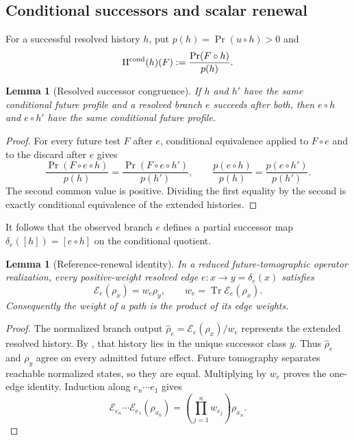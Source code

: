 \documentclass[11pt]{article}
\newtheorem{lemma}[theorem]{Lemma}
\theoremstyle{definition}
\theoremstyle{remark}
\newcommand{\Tr}{\operatorname{Tr}}
\begin{document}
\subsection{Conditional successors and scalar renewal}

For a successful resolved history $h$, put
$p(h)=\Pr(u\circ h)>0$ and
\[
  \Pi^{\rm cond}(h)(F):=\frac{\Pr(F\circ h)}{p(h)}.
\]

\begin{lemma}[Resolved successor congruence]
\label{lem:app-successor}
If $h$ and $h'$ have the same conditional future profile and a resolved branch
$e$ succeeds after both, then $e\circ h$ and $e\circ h'$ have the same
conditional future profile.
\end{lemma}

\begin{proof}
For every future test $F$ after $e$, conditional equivalence applied to
$F\circ e$ and to the discard after $e$ gives
\[
 \frac{\Pr(F\circ e\circ h)}{p(h)}
 =\frac{\Pr(F\circ e\circ h')}{p(h')},
 \qquad
 \frac{p(e\circ h)}{p(h)}
 =\frac{p(e\circ h')}{p(h')}.
\]
The second common value is positive.  Dividing the first equality by the second
is exactly conditional equivalence of the extended histories.
\end{proof}

It follows that the observed branch $e$ defines a partial successor map
$\delta_e([h])=[e\circ h]$ on the conditional quotient.

\begin{lemma}[Reference-renewal identity]
\label{lem:app-reference-renewal}
In a reduced future-tomographic operator realization, every positive-weight
resolved edge $e:x\to y=\delta_e(x)$ satisfies
\[
  \mathcal E_e(\rho_x)=w_e\rho_y,
  \qquad w_e=\Tr\mathcal E_e(\rho_x).
\]
Consequently the weight of a path is the product of its edge weights.
\end{lemma}

\begin{proof}
The normalized branch output
$\widehat\rho_e=\mathcal E_e(\rho_x)/w_e$ represents the extended resolved
history.  By , that history lies in the unique successor
class $y$.  Thus $\widehat\rho_e$ and $\rho_y$ agree on every admitted future
effect.  Future tomography separates reachable normalized states, so they are
equal.  Multiplying by $w_e$ proves the one-edge identity.  Induction along
$e_n\cdots e_1$ gives
\[
 \mathcal E_{e_n}\cdots\mathcal E_{e_1}(\rho_{x_0})
 =\left(\prod_{j=1}^n w_{e_j}\right)\rho_{x_n}.
\]
\end{proof}
\end{document}
